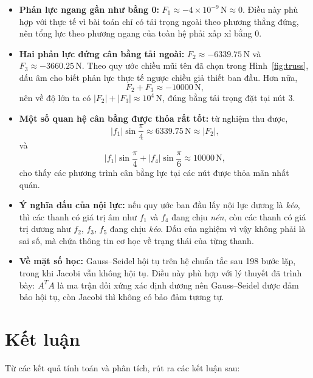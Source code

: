 \documentclass[12pt,a4paper]{article}
\begin{document}
\begin{itemize}
    \item \textbf{Phản lực ngang gần như bằng 0:} $F_1 \approx -4\times 10^{-9}\,\mathrm{N} \approx 0$. Điều này phù hợp với thực tế vì bài toán chỉ có tải trọng ngoài theo phương thẳng đứng, nên tổng lực theo phương ngang của toàn hệ phải xấp xỉ bằng 0.
    \item \textbf{Hai phản lực đứng cân bằng tải ngoài:} $F_2 \approx -6339.75\,\mathrm{N}$ và $F_3 \approx -3660.25\,\mathrm{N}$. Theo quy ước chiều mũi tên đã chọn trong Hình~\ref{fig:truss}, dấu âm cho biết phản lực thực tế ngược chiều giả thiết ban đầu. Hơn nữa,
    \[
        F_2 + F_3 \approx -10000\,\mathrm{N},
    \]
    nên về độ lớn ta có $|F_2| + |F_3| \approx 10^4\,\mathrm{N}$, đúng bằng tải trọng đặt tại nút 3.
    \item \textbf{Một số quan hệ cân bằng được thỏa rất tốt:} từ nghiệm thu được,
    \[
        |f_1|\sin\frac{\pi}{4} \approx 6339.75\,\mathrm{N} \approx |F_2|,
    \]
    và
    \[
        |f_1|\sin\frac{\pi}{4} + |f_4|\sin\frac{\pi}{6} \approx 10000\,\mathrm{N},
    \]
    cho thấy các phương trình cân bằng lực tại các nút được thỏa mãn nhất quán.
    \item \textbf{Ý nghĩa dấu của nội lực:} nếu quy ước ban đầu lấy nội lực dương là \emph{kéo}, thì các thanh có giá trị âm như $f_1$ và $f_4$ đang chịu \emph{nén}, còn các thanh có giá trị dương như $f_2$, $f_3$, $f_5$ đang chịu \emph{kéo}. Dấu của nghiệm vì vậy không phải là sai số, mà chứa thông tin cơ học về trạng thái của từng thanh.
    \item \textbf{Về mặt số học:} Gauss--Seidel hội tụ trên hệ chuẩn tắc sau 198 bước lặp, trong khi Jacobi vẫn không hội tụ. Điều này phù hợp với lý thuyết đã trình bày: $A^TA$ là ma trận đối xứng xác định dương nên Gauss--Seidel được đảm bảo hội tụ, còn Jacobi thì không có bảo đảm tương tự.
\end{itemize}

\section{Kết luận}

Từ các kết quả tính toán và phân tích, rút ra các kết luận sau:
\end{document}
